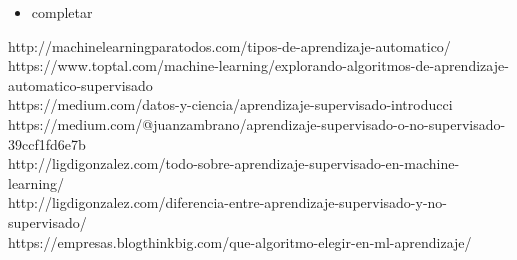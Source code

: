 \documentclass[%
 reprint,
 amsmath,amssymb,
 aps,
]{revtex4-1}
\begin{document}
\begin{itemize}
\item 
completar

\end{itemize}

\newpage

\begin{thebibliography}{99}
http://machinelearningparatodos.com/tipos-de-aprendizaje-automatico/\\
https://www.toptal.com/machine-learning/explorando-algoritmos-de-aprendizaje-automatico-supervisado\\
https://medium.com/datos-y-ciencia/aprendizaje-supervisado-introducci%
https://medium.com/@juanzambrano/aprendizaje-supervisado-o-no-supervisado-39ccf1fd6e7b\\
http://ligdigonzalez.com/todo-sobre-aprendizaje-supervisado-en-machine-learning/\\
http://ligdigonzalez.com/diferencia-entre-aprendizaje-supervisado-y-no-supervisado/\\
https://empresas.blogthinkbig.com/que-algoritmo-elegir-en-ml-aprendizaje/\\



\end{thebibliography}
\end{document}
